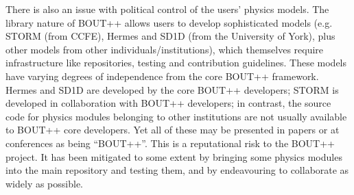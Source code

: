 There is also an issue with political control of the users' physics models. 
The library nature of BOUT++ allows users to develop sophisticated models (e.g. STORM (from CCFE), Hermes and SD1D (from the University of York), plus other models from other individuals/institutions), which themselves require infrastructure like repositories, testing and contribution guidelines. 
These models have varying degrees of independence from the core BOUT++ framework.  
Hermes and SD1D are developed by the core BOUT++ developers; STORM is developed in collaboration with BOUT++ developers; in contrast, the source code for physics modules belonging to other institutions are not usually available to BOUT++ core developers.
    Yet all of these may be presented in papers or at conferences as being ``BOUT++''.
    This is a reputational risk to the BOUT++ project.
    It has been mitigated to some extent by bringing some physics modules into the main repository and testing them, and by endeavouring to collaborate as widely as possible.
